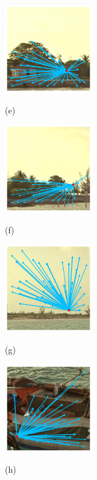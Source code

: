 \begin{figure}[]
		\begin{minipage}[t]{.24\linewidth}
			\includegraphics[width=1.5in]{cropped/boat_superpixel_0.jpg}
			\centerline{(e)}
			\label{BOAT-1}
		\end{minipage}
		\begin{minipage}[t]{.24\linewidth}
			\includegraphics[width=1.5in]{cropped/boat_superpixel_1.jpg}
			\centerline{(f)}
			\label{BOAT-2}
		\end{minipage}
		\begin{minipage}[t]{.24\linewidth}
			\includegraphics[width=1.5in]{cropped/boat_superpixel_3.jpg}
			\centerline{(g)}
			\label{BOAT-3}
		\end{minipage}
		\begin{minipage}[t]{.24\linewidth}
			\includegraphics[width=1.5in]{cropped/boat_superpixel_9.jpg}
			\centerline{(h)}
			\label{BOAT-4}
		\end{minipage}
		\begin{minipage}[t]{.24\linewidth}

\end{minipage}
\end{figure}
